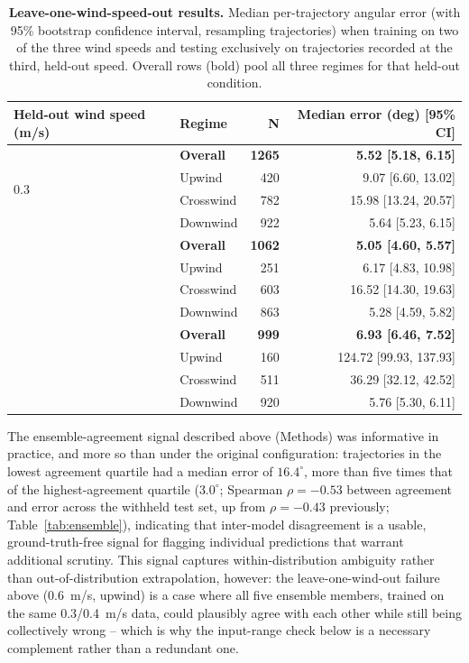 \documentclass[11pt]{article}
\begin{document}
\begin{table}[h!]
    \centering
    \caption{\textbf{Leave-one-wind-speed-out results.} Median per-trajectory angular error (with 95\% bootstrap confidence interval, resampling trajectories) when training on two of the three wind speeds and testing exclusively on trajectories recorded at the third, held-out speed. Overall rows (bold) pool all three regimes for that held-out condition.}
    \begin{tabular}{@{}llrr@{}}
        \toprule
        Held-out wind speed (m/s) & Regime & N & Median error (deg) [95\% CI] \\
        \midrule
        \multirow{4}{*}{0.3} & \textbf{Overall} & \textbf{1265} & \textbf{5.52 [5.18, 6.15]} \\
        & Upwind & 420 & 9.07 [6.60, 13.02] \\
        & Crosswind & 782 & 15.98 [13.24, 20.57] \\
        & Downwind & 922 & 5.64 [5.23, 6.15] \\
        \addlinespace
        \multirow{4}{*}{0.4} & \textbf{Overall} & \textbf{1062} & \textbf{5.05 [4.60, 5.57]} \\
        & Upwind & 251 & 6.17 [4.83, 10.98] \\
        & Crosswind & 603 & 16.52 [14.30, 19.63] \\
        & Downwind & 863 & 5.28 [4.59, 5.82] \\
        \addlinespace
        \multirow{4}{*}{0.6} & \textbf{Overall} & \textbf{999} & \textbf{6.93 [6.46, 7.52]} \\
        & Upwind & 160 & 124.72 [99.93, 137.93] \\
        & Crosswind & 511 & 36.29 [32.12, 42.52] \\
        & Downwind & 920 & 5.76 [5.30, 6.11] \\
        \bottomrule
    \end{tabular}
    \label{tab:lowo}
\end{table}

The ensemble-agreement signal described above (Methods) was informative in practice, and more so than under the original configuration: trajectories in the lowest agreement quartile had a median error of $16.4^\circ$, more than five times that of the highest-agreement quartile ($3.0^\circ$; Spearman $\rho = -0.53$ between agreement and error across the withheld test set, up from $\rho=-0.43$ previously; Table~\ref{tab:ensemble}), indicating that inter-model disagreement is a usable, ground-truth-free signal for flagging individual predictions that warrant additional scrutiny. This signal captures within-distribution ambiguity rather than out-of-distribution extrapolation, however: the leave-one-wind-out failure above (0.6~m/s, upwind) is a case where all five ensemble members, trained on the same 0.3/0.4~m/s data, could plausibly agree with each other while still being collectively wrong -- which is why the input-range check below is a necessary complement rather than a redundant one.
\end{document}
